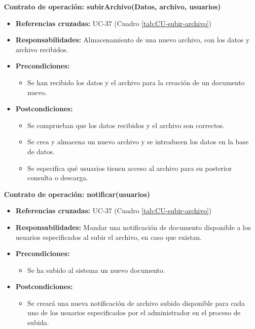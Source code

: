 \textbf{Contrato de operación: subirArchivo(Datos, archivo, usuarios)}
\begin{itemize}
\item \textbf{Referencias cruzadas:} UC-37 (Cuadro \ref{tab:CU-subir-archivo})
\item \textbf{Responsabilidades:} Almacenamiento de una nuevo archivo, con los datos y archivo recibidos.
\item \textbf{Precondiciones:} 
 \begin{itemize}
\item Se han recibido los datos y el archivo para la creación de un documento nuevo.
\end {itemize}
\item \textbf{Postcondiciones:} 
 \begin{itemize}
 \item Se comprueban que los datos recibidos y el archivo son correctos.
\item Se crea y almacena un nuevo archivo y se introducen los datos en la base de datos.
\item Se especifica qué usuarios tienen acceso al archivo para su posterior consulta o descarga.
\end {itemize}
\end {itemize}

\textbf{Contrato de operación: notificar(usuarios)}
\begin{itemize}
\item \textbf{Referencias cruzadas:} UC-37 (Cuadro \ref{tab:CU-subir-archivo})
\item \textbf{Responsabilidades:} Mandar una notificación de documento disponible a los usuarios especificados al subir el archivo, en caso que existan.
\item \textbf{Precondiciones:} 
 \begin{itemize}
\item Se ha subido al sistema un nuevo documento.
\end {itemize}
\item \textbf{Postcondiciones:} 
 \begin{itemize}
\item Se creará una nueva notificación de archivo subido disponible para cada uno de los usuarios especificados por el administrador en el proceso de subida.
\end {itemize}
\end {itemize}

